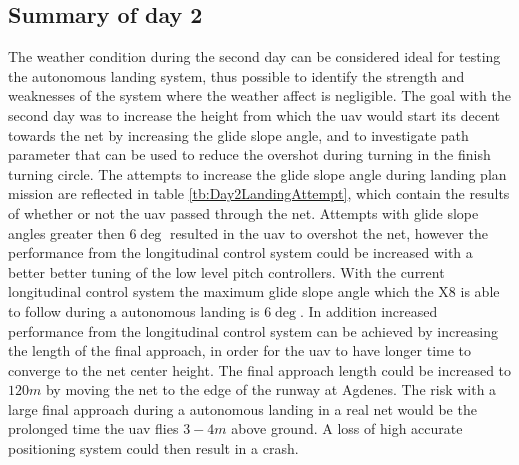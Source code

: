 \subsection{Summary of day 2}\label{ss:SummaryDay2}
The weather condition during the second day can be considered ideal for testing the autonomous landing system, thus possible to identify the strength and weaknesses of the system where the weather affect is negligible. The goal with the second day was to increase the height from which the \gls{uav} would start its decent towards the net by increasing the glide slope angle, and to investigate path parameter that can be used to reduce the overshot during turning in the finish turning circle. The attempts to increase the glide slope angle during landing plan mission are reflected in table \ref{tb:Day2LandingAttempt}, which contain the results of whether or not the \gls{uav} passed through the net. Attempts with glide slope angles greater then $6 \deg$ resulted in the \gls{uav} to overshot the net, however the performance from the longitudinal control system could be increased with a better better tuning of the low level pitch controllers. With the current longitudinal control system the maximum glide slope angle which the X8 is able to follow during a autonomous landing is $6 \deg$. In addition increased performance from the longitudinal control system can be achieved by increasing the length of the final approach, in order for the \gls{uav} to have longer time to converge to the net center height. The final approach length could be increased to $120 m$ by moving the net to the edge of the runway at Agdenes. The risk with a large final approach during a autonomous landing in a real net would be the prolonged time the \gls{uav} flies $3-4 m$ above ground. A loss of high accurate positioning system could then result in a crash.


